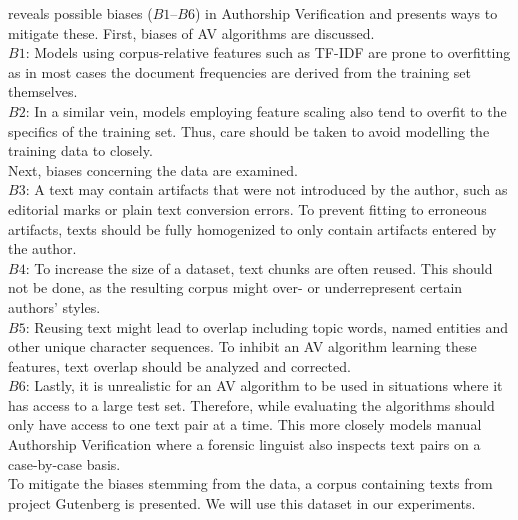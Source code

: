 \cite{stein2019unbiasedGutenbergCorpus} reveals possible biases ($B1$--$B6$) in Authorship Verification and presents ways to mitigate these.
First, biases of AV algorithms are discussed.\\
$B1$: Models using corpus-relative features such as TF-IDF are prone to overfitting as in most cases the document frequencies are derived from the training set themselves.\\
$B2$: In a similar vein, models employing feature scaling also tend to overfit to the specifics of the training set.
Thus, care should be taken to avoid modelling the training data to closely.\\
Next, biases concerning the data are examined.\\
$B3$: A text may contain artifacts that were not introduced by the author, such as editorial marks or plain text conversion errors.
To prevent fitting to erroneous artifacts, texts should be fully homogenized to only contain artifacts entered by the author.\\
$B4$: To increase the size of a dataset, text chunks are often reused.
This should not be done, as the resulting corpus might over- or underrepresent certain authors' styles.\\
$B5$: Reusing text might lead to overlap including topic words, named entities and other unique character sequences.
To inhibit an AV algorithm learning these features, text overlap should be analyzed and corrected.\\
$B6$: Lastly, it is unrealistic for an AV algorithm to be used in situations where it has access to a large test set.
Therefore, while evaluating the algorithms should only have access to one text pair at a time.
This more closely models manual Authorship Verification where a forensic linguist also inspects text pairs on a case-by-case basis.\\
To mitigate the biases stemming from the data, a corpus containing texts from project Gutenberg is presented.
We will use this dataset in our experiments.\\

